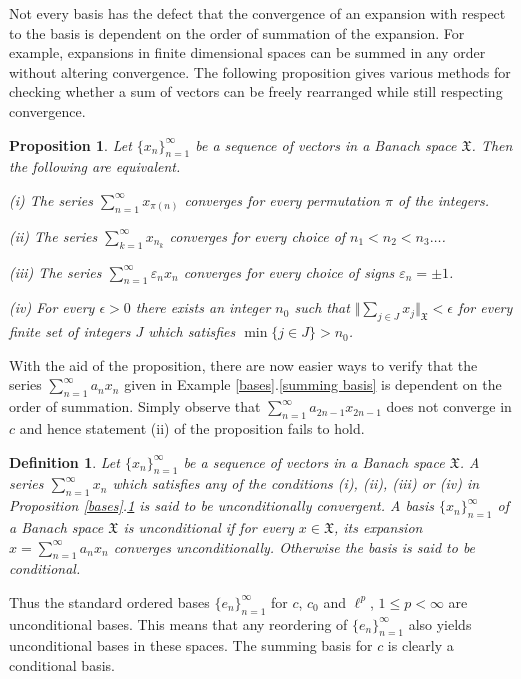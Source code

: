\documentclass[12pt]{UNSWthesis}
\newcommand{\X}{\mathfrak{X}}
\newcommand{\reff}[2]{\ref{#1}.\ref{#2}}
\def\lp{\ell^p}
\def\ssnorm#1{\Vert #1 \Vert}
\newtheorem{proposition}[theorem]{Proposition}
\newtheorem{definition}[theorem]{Definition}
\numberwithin{equation}{section}
\begin{document}
Not every basis has the defect that the convergence of an expansion with respect
to the basis is dependent on the order of summation of the expansion. For
example, expansions in finite dimensional spaces can be summed in any order
without altering convergence. The following proposition gives various methods 
for
checking whether a sum of vectors can be freely rearranged while still
respecting convergence.

\begin{proposition}\label{unconditional conv}
\cite[Proposition 1.c.1]{Lind}
Let $\{x_n\}_{n=1}^{\infty}$ be a sequence of vectors in a Banach space $\X$.
Then the following are equivalent.

(i) The series $\sum_{n=1}^{\infty}x_{\pi(n)}$ converges for every permutation
$\pi$ of the integers.

(ii) The series $\sum_{k=1}^{\infty}x_{n_k}$ converges for every choice of
$n_1<n_2<n_3\ldots$.

(iii) The series $\sum_{n=1}^{\infty}\varepsilon_nx_n$ converges
for every choice of signs $\varepsilon_n=\pm 1$.

(iv) For every $\epsilon>0$ there exists an integer $n_0$ such that
$\ssnorm{\sum_{j\in J}x_j}_{\X}<\epsilon$ for every finite set of integers $J$
which satisfies $\min\{j\in J\}>n_0$.
\end{proposition}

With the aid of the proposition, there are now easier ways to verify that the
series
$\sum_{n=1}^{\infty}a_nx_n$ given in Example \reff{bases}{summing basis} is
dependent on the order of summation. Simply observe that
$\sum_{n=1}^{\infty}a_{2n-1}x_{2n-1}$ does not converge in $c$ and hence 
statement (ii) of the proposition fails to hold.

\begin{definition}
Let $\{x_n\}_{n=1}^{\infty}$ be a sequence of vectors in a Banach space $\X$.
A series $\sum_{n=1}^{\infty}x_n$ which satisfies any of the conditions (i),
(ii), (iii) or (iv) in Proposition \reff{bases}{unconditional conv} is said to 
be
{\em unconditionally convergent}. A basis $\{x_n\}_{n=1}^{\infty}$ of a Banach
space $\X$ is {\em unconditional} if for every $x\in\X$, its expansion
$x=\sum_{n=1}^{\infty}a_nx_n$ converges unconditionally. Otherwise the basis is
said to be {\em conditional}.
\end{definition}

Thus the standard ordered bases $\{e_n\}_{n=1}^{\infty}$ for $c$, $c_0$ and
$\lp$,
$1\leq p<\infty$ are unconditional bases. This means that any reordering of
$\{e_n\}_{n=1}^{\infty}$ also yields unconditional bases in these spaces.
The summing basis for $c$ is clearly a conditional basis.
\end{document}
